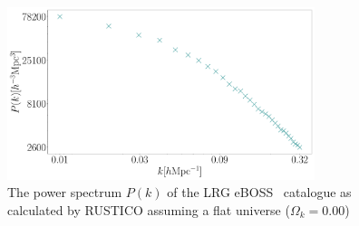 \begin{figure}[t]
	\centering
	\includegraphics[width=0.8\textwidth]{../figs/Pkrustico.pdf}
	\caption[Power spectrum of the LRG eBOSS catalogue]{The power spectrum $P(k)$ of the LRG eBOSS~\cite{eBoss} catalogue as calculated by RUSTICO assuming a flat universe ($\Omega_k = 0.00$)}
	\label{fig:rustico}
\end{figure}


